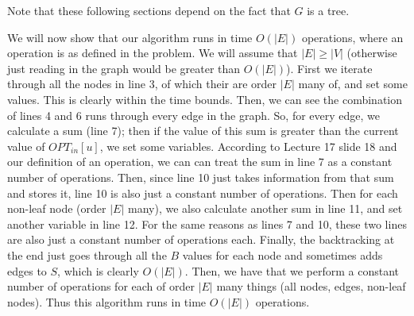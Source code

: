 \documentclass{article}
\begin{document}
\vspace{5mm}
Note that these following sections depend on the fact that $G$ is a tree.

We will now show that our algorithm runs in time $O(|E|)$ operations, where an
operation is as defined in the problem. We will assume that $|E| \geq |V|$
(otherwise just reading in the graph would be greater than $O(|E|)$).
First we iterate through all the nodes in line 3,
of which their are order $|E|$ many of, and set some values. This is clearly
within the time bounds. Then, we can see the combination of lines 4
and 6 runs through every edge in the graph. So, for every edge, we
calculate a sum (line 7); then if the value of this sum is greater than the
current value of $OPT_{in}[u]$, we set some variables. According to Lecture 17
slide 18 and our definition of an operation, we can can treat the sum in line 7
as a constant number of operations. Then, since line 10 just takes information from that sum and
stores it, line 10 is also just a constant number of operations. Then for each
non-leaf node (order $|E|$ many), we also calculate another sum
in line 11, and set another variable in line 12. For the same reasons as lines 7
and 10, these two lines are also just a constant number of operations each.
Finally, the backtracking at the end just goes through all the $B$ values for
each node and sometimes adds edges to $S$, which is clearly $O(|E|)$. Then, we have that
we perform a constant number of operations for each of order $|E|$ many things (all
nodes, edges, non-leaf nodes). Thus this algorithm
runs in time $O(|E|)$ operations.
\end{document}
